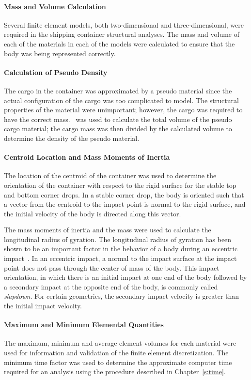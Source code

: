 \paragraph*{Mass and Volume Calculation} Several finite element
models, both two-dimensional and three-dimensional, were required in
the shipping container structural analyses.  The mass and volume of
each of the materials in each of the models were calculated to ensure
that the body was being represented correctly.

\paragraph*{Calculation of Pseudo Density} The cargo in the container
was approximated by a pseudo material since the actual configuration
of the cargo was too complicated to model.  The structural properties
of the material were unimportant; however, the cargo was required to
have the correct mass.  \NUM\ was used to calculate the total volume
of the pseudo cargo material; the cargo mass was then divided by the
calculated volume to determine the density of the pseudo material.

\paragraph*{Centroid Location and Mass Moments of Inertia} The
location of the centroid of the container was  used to
determine the orientation of the container with respect to the rigid
surface for the stable top and bottom corner drops.  In a stable
corner drop, the body is oriented such that a vector from the centroid
to the impact point is normal to the rigid surface, and the
initial velocity of the body is directed along this vector.

The mass moments of inertia and the mass were used to calculate the
longitudinal radius of gyration.  The longitudinal radius of gyration
has been shown to be an important factor in the behavior of a body
during an eccentric impact~\cite{slapdown}. In an eccentric impact, a
normal to the impact surface at the impact point does not pass through
the center of mass of the body.  This impact orientation, in which
there is an initial impact at one end of the body followed by a
secondary impact at the opposite end of the body, is commonly called
{\em slapdown}.  For certain geometries, the secondary impact velocity
is greater than the initial impact velocity.

\paragraph*{Maximum and Minimum Elemental Quantities} The maximum,
minimum and average element volumes for each material were used for
information and validation of the finite element discretization.  The
minimum time factor was used to determine the approximate computer
time required for an analysis using the procedure described in
Chapter~\ref{s:time}.

